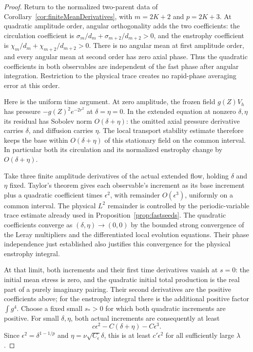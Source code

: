 \documentclass[11pt]{article}
\theoremstyle{remark}
\begin{document}
\begin{proof}
Return to the normalized two-parent data of
Corollary~\ref{cor:finiteMeanDerivatives}, with $m=2K+2$ and $p=2K+3$.
At quadratic amplitude order, angular orthogonality adds the two
coefficients: the circulation coefficient is
$\sigma_m/d_m+\sigma_{m+2}/d_{m+2}>0$, and the enstrophy coefficient
is $\chi_m/d_m+\chi_{m+2}/d_{m+2}>0$.
There is no angular mean at first amplitude order, and every angular
mean at second order has zero axial phase. Thus the quadratic
coefficients in both observables are independent of the fast phase
after angular integration. Restriction to the physical trace creates
no rapid-phase averaging error at this order.

Here is the uniform time argument. At zero amplitude, the frozen
field $g(Z)V_h$ has pressure $-g(Z)^2e^{-2r^2}$ at $\delta=\eta=0$.
In the extended equation at nonzero $\delta,\eta$ its residual has
Sobolev norm $O(\delta+\eta)$: the omitted axial pressure derivative
carries $\delta$, and diffusion carries $\eta$.
The local transport stability estimate therefore keeps the base
within $O(\delta+\eta)$ of this stationary field on the common interval.
In particular both its circulation and its normalized enstrophy change
by $O(\delta+\eta)$.

Take three finite amplitude derivatives of the actual extended flow,
holding $\delta$ and $\eta$ fixed.
Taylor's theorem gives each observable's increment as its base increment
plus a quadratic coefficient times $\epsilon^2$, with remainder
$O(\epsilon^3)$, uniformly on a common interval. The physical $L^2$
remainder is controlled by the periodic-variable trace estimate already
used in Proposition~\ref{prop:fastseeds}.
The quadratic coefficients converge as $(\delta,\eta)\to(0,0)$ by
the bounded strong convergence of the Leray multipliers and the
differentiated local evolution equations. Their phase independence
just established also justifies this convergence for the physical
enstrophy integral.

At that limit, both increments and their first time derivatives vanish
at $s=0$: the initial mean stress is zero, and the quadratic initial
total production is the real part of a purely imaginary pairing.
Their second derivatives are the positive coefficients above;
for the enstrophy integral there is the additional positive factor
$\int g^4$. Choose a fixed small $s_*>0$ for which both quadratic
increments are positive. For small $\delta,\eta$, both actual increments
are consequently at least
\[
 c\epsilon^2-C(\delta+\eta)-C\epsilon^3.
\]
Since $\epsilon^2=\delta^{1-1/p}$ and
$\eta=\nu\sqrt{C_\epsilon}\delta$, this is at least
$c'\epsilon^2$ for all sufficiently large $\lambda$.


\end{proof}
\end{document}
